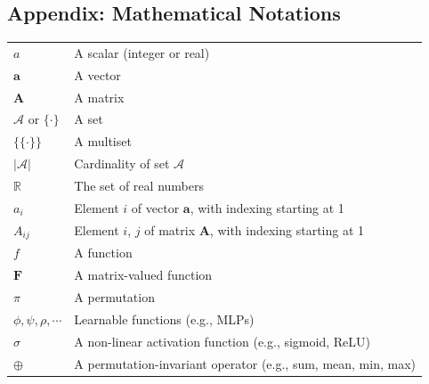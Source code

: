 \documentclass{article}
\begin{document}
\newpage

\subsection*{Appendix: Mathematical Notations}

\renewcommand\arraystretch{1.5}
\begin{tabular}{p{2cm}p{12cm}}
	$\displaystyle a$ & A scalar (integer or real) \\
	$\displaystyle \mathbf{a}$ & A vector \\
	$\displaystyle \mathbf{A}$ & A matrix \\
	$\displaystyle \mathcal{A}\text{ or }\{\cdot\}$ & A set \\
	$\displaystyle \{\!\{\cdot\}\!\}$ & A multiset \\
	$\displaystyle |\mathcal{A}|$ & Cardinality of set $\mathcal{A}$ \\
	$\displaystyle \mathbb{R}$ & The set of real numbers \\
	$\displaystyle a_i$ & Element $i$ of vector $\mathbf{a}$, with indexing starting at 1 \\
	$\displaystyle A_{ij}$ & Element $i$, $j$ of matrix $\mathbf{A}$, with indexing starting at 1 \\
	$\displaystyle f$ & A function \\
	$\displaystyle \bm{F}$ & A matrix-valued function \\
	$\displaystyle \pi$ & A permutation \\
	$\displaystyle \phi, \psi, \rho, \cdots$ & Learnable functions (e.g., MLPs) \\
	$\displaystyle \sigma$ & A non-linear activation function (e.g., sigmoid, ReLU) \\
	$\displaystyle \oplus$ & A permutation-invariant operator (e.g., sum, mean, min, max)
\end{tabular}
\end{document}

